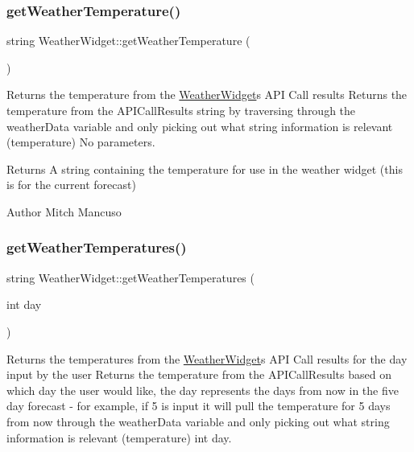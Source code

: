 \subsubsection{\texorpdfstring{get\+Weather\+Temperature()}{getWeatherTemperature()}}
{\footnotesize\ttfamily string Weather\+Widget\+::get\+Weather\+Temperature (\begin{DoxyParamCaption}{ }\end{DoxyParamCaption})}



Returns the temperature from the \mbox{\hyperlink{class_weather_widget}{Weather\+Widget}}\textquotesingle{}s A\+PI Call results  Returns the temperature from the A\+P\+I\+Call\+Results string by traversing through the weather\+Data variable and only picking out what string information is relevant (temperature)  No parameters. 

\begin{DoxyReturn}{Returns}
A string containing the temperature for use in the weather widget (this is for the current forecast) 
\end{DoxyReturn}
\begin{DoxyAuthor}{Author}
Mitch Mancuso 
\end{DoxyAuthor}
\mbox{\label{class_weather_widget_ae1ed8db845a67b1471ea78748a75c748}} 
\subsubsection{\texorpdfstring{get\+Weather\+Temperatures()}{getWeatherTemperatures()}}
{\footnotesize\ttfamily string Weather\+Widget\+::get\+Weather\+Temperatures (\begin{DoxyParamCaption}\item[{int}]{day }\end{DoxyParamCaption})}



Returns the temperatures from the \mbox{\hyperlink{class_weather_widget}{Weather\+Widget}}\textquotesingle{}s A\+PI Call results for the day input by the user  Returns the temperature from the A\+P\+I\+Call\+Results based on which day the user would like, the day represents the days from now in the five day forecast -\/ for example, if 5 is input it will pull the temperature for 5 days from now through the weather\+Data variable and only picking out what string information is relevant (temperature)  int day. 


